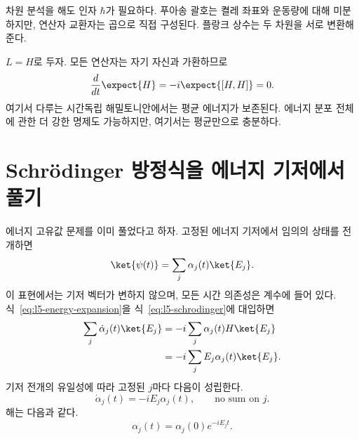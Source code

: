 차원 분석을 해도 인자 \(\hbar\)가 필요하다. 푸아송 괄호는 켤레 좌표와 운동량에 대해 미분하지만, 연산자 교환자는 곱으로 직접 구성된다. 플랑크 상수는 두 차원을 서로 변환해 준다.

\(L=H\)로 두자. 모든 연산자는 자기 자신과 가환하므로
\begin{equation}
\frac{d}{dt}\expect{H}
=-i\expect{[H,H]}=0.
\end{equation}
여기서 다루는 시간독립 해밀토니안에서는 평균 에너지가 보존된다. 에너지 분포 전체에 관한 더 강한 명제도 가능하지만, 여기서는 평균만으로 충분하다.

\begin{classroomqa}\end{classroomqa}

\begin{classroomqa}\end{classroomqa}

\section{Schr\"odinger 방정식을 에너지 기저에서 풀기}

에너지 고유값 문제를 이미 풀었다고 하자. 고정된 에너지 기저에서 임의의 상태를 전개하면
\begin{equation}
\ket{\psi(t)}=\sum_j\alpha_j(t)\ket{E_j}.
\label{eq:l5-energy-expansion}
\end{equation}
이 표현에서는 기저 벡터가 변하지 않으며, 모든 시간 의존성은 계수에 들어 있다. 식~\eqref{eq:l5-energy-expansion}을 식~\eqref{eq:l5-schrodinger}에 대입하면
\begin{align}
\sum_j\dot\alpha_j(t)\ket{E_j}
&=-i\sum_j\alpha_j(t)H\ket{E_j}\\
&=-i\sum_j E_j\alpha_j(t)\ket{E_j}.
\end{align}
기저 전개의 유일성에 따라 고정된 \(j\)마다 다음이 성립한다.
\begin{equation}
\dot\alpha_j(t)=-iE_j\alpha_j(t),
\qquad\text{no sum on \(j\)}.
\end{equation}
해는 다음과 같다.
\begin{equation}
\alpha_j(t)=\alpha_j(0)e^{-iE_jt}.
\label{eq:l5-energy-phase}
\end{equation}

